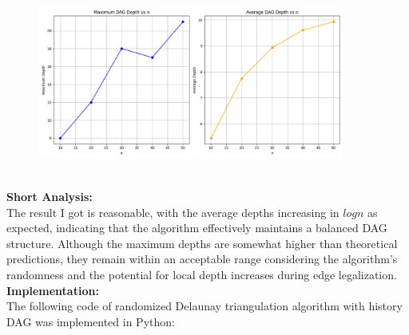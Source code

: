 \documentclass{article}
\begin{document}
\begin{figure}[h]
    \centering
    \includegraphics[width=0.9\textwidth]{Figure_1.png}
    \label{fig:model}
\end{figure}

\hspace{0.01cm}
\\
\textbf{Short Analysis: }
\\
The result I got is reasonable, with the average depths increasing in $log n$ as expected, indicating that the algorithm effectively maintains a balanced DAG structure. 
Although the maximum depths are somewhat higher than theoretical predictions, they remain within an acceptable range considering the algorithm's randomness and the potential for local depth increases during edge legalization. 
\\
\textbf{Implementation: }
\\
The following code of randomized Delaunay triangulation algorithm with history DAG was implemented in Python:
\end{document}
